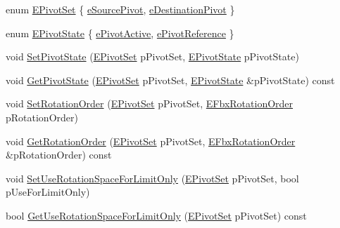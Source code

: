  \begin{DoxyCompactItemize}
\item 
enum \hyperlink{class_fbx_node_ae62b7311ac4727654cdf1ebd5cbf7343}{E\+Pivot\+Set} \{ \hyperlink{class_fbx_node_ae62b7311ac4727654cdf1ebd5cbf7343ae8ed37a5c7e41f8d1cec9d3fa8424b69}{e\+Source\+Pivot}, 
\hyperlink{class_fbx_node_ae62b7311ac4727654cdf1ebd5cbf7343a9822ce03ebfd64b85ca6a570201eb3cc}{e\+Destination\+Pivot}
 \}
\item 
enum \hyperlink{class_fbx_node_a153fc75958227fc6728a2233b630b58a}{E\+Pivot\+State} \{ \hyperlink{class_fbx_node_a153fc75958227fc6728a2233b630b58aa3e58a6a13e3ace7a8df4e10d38e830ad}{e\+Pivot\+Active}, 
\hyperlink{class_fbx_node_a153fc75958227fc6728a2233b630b58aa461fb50a03f81968c296135f74523bdd}{e\+Pivot\+Reference}
 \}
\item 
void \hyperlink{class_fbx_node_ab1d3cf6ac101fe39387f026e72955a4e}{Set\+Pivot\+State} (\hyperlink{class_fbx_node_ae62b7311ac4727654cdf1ebd5cbf7343}{E\+Pivot\+Set} p\+Pivot\+Set, \hyperlink{class_fbx_node_a153fc75958227fc6728a2233b630b58a}{E\+Pivot\+State} p\+Pivot\+State)
\item 
void \hyperlink{class_fbx_node_a92c29d9151e6b490c27ca0831a52d566}{Get\+Pivot\+State} (\hyperlink{class_fbx_node_ae62b7311ac4727654cdf1ebd5cbf7343}{E\+Pivot\+Set} p\+Pivot\+Set, \hyperlink{class_fbx_node_a153fc75958227fc6728a2233b630b58a}{E\+Pivot\+State} \&p\+Pivot\+State) const
\item 
void \hyperlink{class_fbx_node_a360b2d1aba9f7a7cf0b09f1d4e921885}{Set\+Rotation\+Order} (\hyperlink{class_fbx_node_ae62b7311ac4727654cdf1ebd5cbf7343}{E\+Pivot\+Set} p\+Pivot\+Set, \hyperlink{fbxmath_8h_ae46778666b56bb0abe5992b855fe9332}{E\+Fbx\+Rotation\+Order} p\+Rotation\+Order)
\item 
void \hyperlink{class_fbx_node_a7f9a892ce7689d2a99c445bb989ff1e6}{Get\+Rotation\+Order} (\hyperlink{class_fbx_node_ae62b7311ac4727654cdf1ebd5cbf7343}{E\+Pivot\+Set} p\+Pivot\+Set, \hyperlink{fbxmath_8h_ae46778666b56bb0abe5992b855fe9332}{E\+Fbx\+Rotation\+Order} \&p\+Rotation\+Order) const
\item 
void \hyperlink{class_fbx_node_a34289245325b1dec86bb441e429706d0}{Set\+Use\+Rotation\+Space\+For\+Limit\+Only} (\hyperlink{class_fbx_node_ae62b7311ac4727654cdf1ebd5cbf7343}{E\+Pivot\+Set} p\+Pivot\+Set, bool p\+Use\+For\+Limit\+Only)
\item 
bool \hyperlink{class_fbx_node_a1d248029e83c952293b0be6f4474e59d}{Get\+Use\+Rotation\+Space\+For\+Limit\+Only} (\hyperlink{class_fbx_node_ae62b7311ac4727654cdf1ebd5cbf7343}{E\+Pivot\+Set} p\+Pivot\+Set) const

\end{DoxyCompactItemize}
